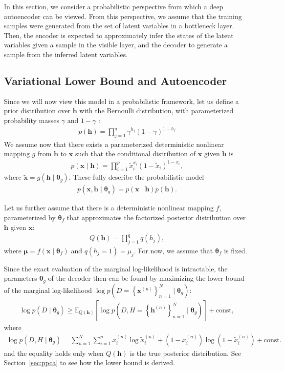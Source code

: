 \documentclass{now}
\newcommand{\vect}[1]{\mathbf{#1}}
\newcommand{\vects}[1]{\boldsymbol{#1}}
\newcommand{\vh}[0]{\vect{h}}
\newcommand{\vx}[0]{\vect{x}}
\newcommand{\vmu}[0]{\vects{\mu}}
\newcommand{\TT}[0]{{\vects{\theta}}}
\newcommand{\E}[0]{\mathbb{E}}
\begin{document}
In this section, we consider a probabilistic perspective from which a deep
autoencoder can be viewed. From this perspective, we assume that the training
samples were generated from the set of latent variables in a bottleneck layer.
Then, the encoder is expected to approximately infer the states of the latent
variables given a sample in the visible layer, and the decoder to generate a
sample from the inferred latent variables.

\subsection{Variational Lower Bound and Autoencoder}
\label{sec:autoencoder_vari}

Since we will now view this model in a probabilistic framework, let us define a
prior distribution over $\vh$ with the Bernoulli distribution, with
parameterized probability masses
$\gamma$ and $1-\gamma$ :
\begin{align}
    \label{eq:ae_prior}
    p(\vh) = \prod_{j=1}^q \gamma^{h_j} (1 - \gamma)^{1 - h_j}
\end{align}
We assume now that there exists a parameterized deterministic nonlinear mapping
$g$ from $\vh$ to $\vx$ such that the conditional distribution of $\vx$ given
$\vh$ is
\begin{align}
    \label{eq:ae_cond}
    p(\vx \mid \vh) = \prod_{i=1}^p \tilde{x}_i^{x_i} (1-\tilde{x}_i)^{1 - x_i},
\end{align}
where $\tilde{\vx} = g(\vh \mid \TT_g)$. These fully describe the probabilistic
model 
\begin{align}
    \label{eq:ae_full}
    p(\vx, \vh \mid \TT_g) = p(\vx \mid \vh) p(\vh).
\end{align}

Let us further assume that there is a deterministic nonlinear mapping $f$,
parameterized by $\TT_f$ that approximates the factorized posterior distribution
over $\vh$ given $\vx$:
\begin{align}
    \label{eq:ae_posterior}
    Q(\vh) = \prod_{j=1}^q q(h_j),
\end{align}
where $\vmu = f(\vx \mid \TT_f)$ and $q(h_j = 1) = \mu_j$.  For now, we assume
that $\TT_f$ is fixed.

Since the exact evaluation of the marginal log-likelihood is intractable, the
parameters $\TT_g$ of the decoder then can be found by maximizing the lower
bound of the marginal log-likelihood $\log p(D = \left\{ \vx^{(n)}
\right\}_{n=1}^N \mid \TT_g)$:
\begin{align}
    \label{eq:ae_lowerbound}
    \log p(D \mid \TT_g) \geq \E_{Q(\vh)} \left[ \log p\left(D,
    H=\left\{ \vh^{(n)} \right\}_{n=1}^N \mid \TT_g\right) \right] +
    \text{const},
\end{align}
where 
\begin{align*}
    \log p(D, H \mid \TT_g) = \sum_{n=1}^N \sum_{i=1}^p
    x^{(n)}_i \log
    \tilde{x}^{(n)}_i + (1 - x^{(n)}_i) \log (1 -
    \tilde{x}^{(n)}_i) + \text{const}.
\end{align*}
and the equality holds only when $Q(\vh)$ is the true posterior distribution.
See Section~\ref{sec:ppca} to see how the lower bound is derived.
\end{document}
